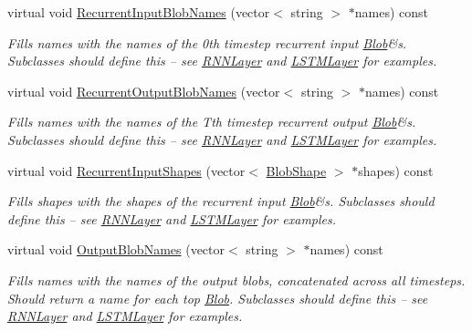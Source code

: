 \begin{DoxyCompactItemize}
virtual void \mbox{\hyperlink{classcaffe_1_1_r_n_n_layer_aaa0dfa8ce302d5344878e2bf7657a19f}{Recurrent\+Input\+Blob\+Names}} (vector$<$ string $>$ $\ast$names) const
\begin{DoxyCompactList}\small\item\em Fills names with the names of the 0th timestep recurrent input \mbox{\hyperlink{classcaffe_1_1_blob}{Blob}}\&s. Subclasses should define this -- see \mbox{\hyperlink{classcaffe_1_1_r_n_n_layer}{R\+N\+N\+Layer}} and \mbox{\hyperlink{classcaffe_1_1_l_s_t_m_layer}{L\+S\+T\+M\+Layer}} for examples. \end{DoxyCompactList}\item 
\mbox{\label{classcaffe_1_1_r_n_n_layer_a0e0aaaf267763240611778ef8246b984}} 
virtual void \mbox{\hyperlink{classcaffe_1_1_r_n_n_layer_a0e0aaaf267763240611778ef8246b984}{Recurrent\+Output\+Blob\+Names}} (vector$<$ string $>$ $\ast$names) const
\begin{DoxyCompactList}\small\item\em Fills names with the names of the Tth timestep recurrent output \mbox{\hyperlink{classcaffe_1_1_blob}{Blob}}\&s. Subclasses should define this -- see \mbox{\hyperlink{classcaffe_1_1_r_n_n_layer}{R\+N\+N\+Layer}} and \mbox{\hyperlink{classcaffe_1_1_l_s_t_m_layer}{L\+S\+T\+M\+Layer}} for examples. \end{DoxyCompactList}\item 
\mbox{\label{classcaffe_1_1_r_n_n_layer_aaeafbc56f743014c14411f8ae5e345ff}} 
virtual void \mbox{\hyperlink{classcaffe_1_1_r_n_n_layer_aaeafbc56f743014c14411f8ae5e345ff}{Recurrent\+Input\+Shapes}} (vector$<$ \mbox{\hyperlink{classcaffe_1_1_blob_shape}{Blob\+Shape}} $>$ $\ast$shapes) const
\begin{DoxyCompactList}\small\item\em Fills shapes with the shapes of the recurrent input \mbox{\hyperlink{classcaffe_1_1_blob}{Blob}}\&s. Subclasses should define this -- see \mbox{\hyperlink{classcaffe_1_1_r_n_n_layer}{R\+N\+N\+Layer}} and \mbox{\hyperlink{classcaffe_1_1_l_s_t_m_layer}{L\+S\+T\+M\+Layer}} for examples. \end{DoxyCompactList}\item 
\mbox{\label{classcaffe_1_1_r_n_n_layer_ac0e2342200eb1d6c52b3e53f4458c106}} 
virtual void \mbox{\hyperlink{classcaffe_1_1_r_n_n_layer_ac0e2342200eb1d6c52b3e53f4458c106}{Output\+Blob\+Names}} (vector$<$ string $>$ $\ast$names) const
\begin{DoxyCompactList}\small\item\em Fills names with the names of the output blobs, concatenated across all timesteps. Should return a name for each top \mbox{\hyperlink{classcaffe_1_1_blob}{Blob}}. Subclasses should define this -- see \mbox{\hyperlink{classcaffe_1_1_r_n_n_layer}{R\+N\+N\+Layer}} and \mbox{\hyperlink{classcaffe_1_1_l_s_t_m_layer}{L\+S\+T\+M\+Layer}} for examples. \end{DoxyCompactList}\end{DoxyCompactItemize}
